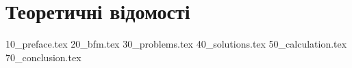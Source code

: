 \chapter{Теоретичні відомості}
{10_preface.tex}
{20_bfm.tex}
{30_problems.tex}
{40_solutions.tex}
{50_calculation.tex}
{70_conclusion.tex}
